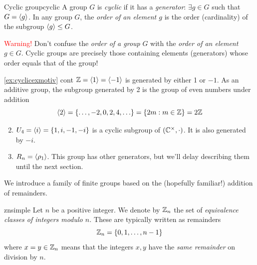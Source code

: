 \begin{defn}{Cyclic group}{cyclic}
	A group $G$ is \emph{cyclic} if it has a \emph{generator}: $\exists g\in G$ such that $G=\left\langle g\right\rangle$.\smallbreak
	In any group $G$, the \emph{order of an element $g$} is the order (cardinality) of the subgroup $\left\langle g\right\rangle\le G$.
\end{defn}

\textcolor{red}{Warning!} Don't confuse the \emph{order of a group} $G$ with the \emph{order of an element} $g\in G$. Cyclic groups are precisely those containing elements (generators) whose order equals that of the group!



\begin{examples*}{\ref{ex:cyclicexmotiv} cont}{}
	\exstart $\mathbb{Z}=\left\langle 1\right\rangle=\left\langle -1\right\rangle$ is generated by either 1 or $-1$. As an additive group, the subgroup generated by 2 is the group of even numbers under addition
	\[
		\left\langle 2\right\rangle=\{\ldots,-2,0,2,4,\ldots\}=\{2m:m\in\mathbb{Z}\}=2\mathbb{Z}
	\]
	\begin{enumerate}\setcounter{enumi}{1}
	  \item $U_4=\left\langle i\right\rangle=\{1,i,-1,-i\}$ is a cyclic subgroup of $(\mathbb{C}^\times,\cdot)$. It is also generated by $-i$.
		\item $R_n=\left\langle \rho_1\right\rangle$. This group has other generators, but we'll delay describing them until the next section.
	\end{enumerate}
\end{examples*}
\goodbreak



We introduce a family of finite groups based on the (hopefully familiar!) addition of remainders.

\begin{defn}{}{znsimple}
	Let $n$ be a positive integer. We denote by $\mathbb{Z}_n$ the set of \emph{equivalence classes of integers modulo $n$.} These are typically written as remainders
	\[
		\mathbb{Z}_n=\{0,1,\ldots,n-1\}
	\]
	where $x=y\in\mathbb{Z}_n$ means that the integers $x,y$ have the \emph{same remainder\footnotemark} on division by $n$.
\end{defn}


